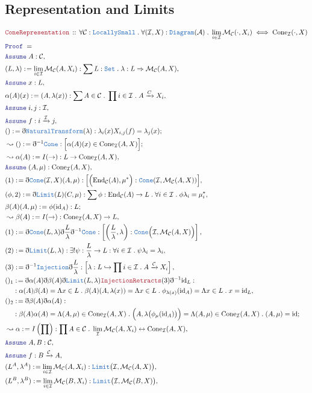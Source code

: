 \documentclass[12pt]{scrartcl}
\newcommand{\TYPE}[1]{\textcolor{NavyBlue}{\mathtt{#1}}}
\newcommand{\LOGIC}[1]{\textcolor{Blue}{\mathtt{#1}}}
\newcommand{\THM}[1]{\textcolor{Maroon}{\mathtt{#1}}}
\renewcommand{\.}{\; . \;}
\newcommand{\de}{: \kern 0.1pc =}
\newcommand{\Theorem}[2]{& \THM{#1} \, :: \, #2 \\ & \Proof = \\ }
\newcommand{\NewLine}{\\ & \kern 1pc}
\newcommand{\Page}[1]{ \begin{align*} #1 \end{align*}   }
\newcommand{ \bd }{ \ByDef }
\DeclareMathOperator*{\id}{id}
\newcommand{\Mor}{\mathcal{M}}
\newcommand{\Endo}{\mathrm{End}}
\newcommand{\ToInj}{\hookrightarrow}
\newcommand{\ToBij}{\leftrightarrow}
\newcommand{\Arrow}{\xrightarrow}
\newcommand{\Set}{\TYPE{Set}}
\newcommand{\Say}[3]{& #1 \de #2 : #3, \\}
\newcommand{\Conclude}[3]{& #1 \de #2 : #3; \\}
\newcommand{\Derive}[3]{& \leadsto #1 \de #2 : #3, \\}
\newcommand{\DeriveConclude}[3]{& \leadsto #1 \de #2 : #3 ; \\}
\newcommand{\Assume}[2]{& \LOGIC{Assume} \; #1 : #2, \\}
\newcommand{\ByDef}{\eth}
\newcommand{\Proof}{\LOGIC{Proof} \; }
\newcommand{\NT}{\TYPE{NaturalTransform}}
\newcommand{\C}{\mathcal{C}}
\newcommand{\A}{\mathcal{A}}
\newcommand{\I}{\mathcal{I}}
\begin{document}
\subsection{Representation and Limits}
\Page{
	\Theorem{ConeRepresentation}
	{ 
		\forall \C  : \TYPE{LocallySmall} \. 
		\forall (\I,X) : \TYPE{Diagram}(\A) \. 
		\lim_{i \in \I} \Mor_\C(\cdot,X_i) \iff \mathrm{Cone}_\I(\cdot,X) 
	}
	\Assume{A}{\C}
	\Say{(L,\lambda)}{\lim_{i \in \I} \Mor_\C(A,X_i)}{ \sum L : \Set \. \lambda : L \Rightarrow \Mor_\C(A,X)  }
	\Assume{x}{L}
	\Say{\alpha(A)(x)}{ (A,\lambda(x))  }{  \sum A \in \C \. \prod i \in \I  \. A \Arrow{C} X_i      }
	\Assume{i,j}{\I}
	\Assume{f}{i \Arrow{\I} j}
	\Conclude{()}{ \bd \NT (\lambda) }{   \lambda_i(x) X_{i,j}(f) = \lambda_j(x)   }
	\DeriveConclude{()}{\bd^{-1} \TYPE{Cone}}{\Big[\alpha(A)(x) \in \mathrm{Cone}_\I(A,X)\Big]}
	\Derive{\alpha(A)}{I(\to)}{L \to \mathrm{Cone}_\I(A,X)}
	\Assume{(A,\mu)}{\mathrm{Cone}_\I(A,X)}
	\Say{(1)}{\bd \TYPE{Cone}(\I,X)(A,\mu)}{\Big[ \Big( \Endo_\C(A),\mu^* \Big) : \TYPE{Cone}( \I, \Mor_\C(A,X)  )   \Big]}
	\Say{(\phi,2)}{\bd \TYPE{Limit}(L)(C,\mu)}{  
		\sum \phi : \Endo_\C(A) \to L \.  \forall i \in \I \.  \phi \lambda_i = \mu_i^*
	}
	\Conclude{\beta(A)(A,\mu)}{ \phi({\id}_A)  }{ L }
	\Derive{\beta(A)}{I(\to)}{ \mathrm{Cone}_\I(A,X) \to L}
	\Say{(1)}{\bd \TYPE{Cone}(L,\lambda) \bd \frac{L}{\lambda} \bd^{-1} \TYPE{Cone}}
	{\left[ \left(  \frac{L}{\lambda}  , \lambda \right) : \TYPE{Cone}\Big(\I,\Mor_\C(A,X)\Big) \right]}
	\Say{(2)}{\bd \TYPE{Limit}(L,\lambda)}
		{\exists! \psi : \frac{L}{\lambda} \to L : \forall i \in \I \. \psi \lambda_i = \lambda_i}
	\Say{(3)}{\bd^{-1} \TYPE{Injection} \bd \frac{L}{\lambda}}
	{\left[ \lambda : L \ToInj \prod i \in \I \. A \Arrow{\C} X_i \right]}
	\Say{()_1}{\bd \alpha(A) \bd \beta(A)  \bd \TYPE{Limit}(L,\lambda)\THM{InjectionRetracts}(3) \bd^{-1} {\id}_L  }
	{
		\NewLine :
		\alpha(A)\beta(A) = 
		\Lambda x \in L \.  \beta(A)(A,\lambda(x)) =
		\Lambda x \in L \.  \phi_{\lambda(x)}({\id}_A) =
		\Lambda x \in L \. x =
		{\id}_L
	}
	\Conclude{()_2}{ \bd \beta(A) \bd \alpha(A)  }
	{
		\NewLine :
		\beta(A)\alpha(A) = 
		\Lambda (A,\mu) \in \mathrm{Cone}_\I(A,X) \. \Big(A,\lambda\big(\phi_\mu({\id}_A)\big)\Big) =
		\Lambda (A,\mu) \in \mathrm{Cone}_\I(A,X) \. (A,\mu) =
		\id
	}
	\Derive{\alpha}{ I\left(\prod\right)   }{ \prod A \in \C \. \lim_\I \Mor_\C(A,X_i) \ToBij \mathrm{Cone}_\I(A,X)    }
	\Assume{A,B}{\C}
	\Assume{f}{B \Arrow{\C} A}
	\Say{(L^A,\lambda^A)}{\lim_{i \in \I} \Mor_{\C}(A,X_i) }{ \TYPE{Limit}\big(\I, \Mor_{\C}(A,X)\big)}
	\Say{(L^B,\lambda^B)}{\lim_{i \in \I} \Mor_{\C}(B,X_i)}{ \TYPE{Limit}\big(\I,\Mor_{\C}(B,X)\big)}
}
\end{document}
